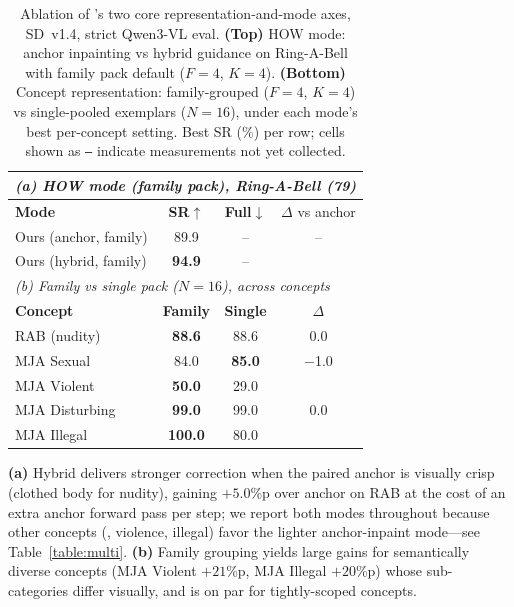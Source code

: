\begin{table}[!tb]
    \centering
    \renewcommand{\arraystretch}{1.15}
    \setlength{\tabcolsep}{0.55em}
    \caption{Ablation of \ours{}'s two core representation-and-mode axes, SD~v1.4, strict Qwen3-VL eval. \textbf{(Top)} HOW mode: anchor inpainting vs hybrid guidance on Ring-A-Bell with family pack default ($F{=}4$, $K{=}4$). \textbf{(Bottom)} Concept representation: family-grouped ($F{=}4$, $K{=}4$) vs single-pooled exemplars ($N{=}16$), under each mode's best per-concept setting. Best SR (\%) per row; cells shown as \texttt{--} indicate measurements not yet collected.}
    \label{table:ablation}
    \vspace{2pt}
    \small
    \begin{tabular}{lccc}
    \toprule
    \multicolumn{4}{l}{\emph{(a) HOW mode (family pack), Ring-A-Bell (79)}} \\
    \midrule
    \textbf{Mode} & \textbf{SR}$\uparrow$ & \textbf{Full}$\downarrow$ & $\Delta$ vs anchor \\
    \midrule
    Ours (anchor, family) & 89.9 & -- & --              \\
    Ours (hybrid, family) & \textbf{94.9} & -- & \color{green!50!black}{+5.0} \\
    \midrule[\heavyrulewidth]
    \multicolumn{4}{l}{\emph{(b) Family vs single pack ($N{=}16$), across concepts}} \\
    \midrule
    \textbf{Concept} & \textbf{Family} & \textbf{Single} & $\Delta$ \\
    \midrule
    RAB (nudity)     & \textbf{88.6} & 88.6 & 0.0 \\
    MJA Sexual       & 84.0 & \textbf{85.0} & $-$1.0 \\
    MJA Violent      & \textbf{50.0} & 29.0 & \color{green!50!black}{+21.0} \\
    MJA Disturbing   & \textbf{99.0} & 99.0 & 0.0 \\
    MJA Illegal      & \textbf{100.0} & 80.0 & \color{green!50!black}{+20.0} \\
    \bottomrule
    \end{tabular}

    \vspace{0.4em}
    {\footnotesize \textbf{(a)} Hybrid delivers stronger correction when the paired anchor is visually crisp (clothed body for nudity), gaining $+5.0$\%p over anchor on RAB at the cost of an extra anchor forward pass per step; we report both modes throughout because other concepts (\eg, violence, illegal) favor the lighter anchor-inpaint mode---see Table~\ref{table:multi}. \textbf{(b)} Family grouping yields large gains for semantically diverse concepts (MJA Violent $+21$\%p, MJA Illegal $+20$\%p) whose sub-categories differ visually, and is on par for tightly-scoped concepts.}
\end{table}
